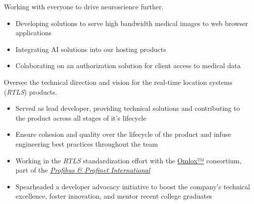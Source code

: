 \documentclass[10pt,a4paper,ragged2e,withhyper]{altacv}
\begin{document}
\begin{paracol}{2}


Working with everyone to drive neuroscience further.

\medskip

\begin{itemize}
  \item Developing solutions to serve high bandwidth medical images to web browser applications
  \item Integrating AI solutions into our hosting products
  \item Colaborating on an authorization solution for client access to medical data 
\end{itemize}


\divider

\medskip



Oversee the technical direction and vision for the real-time location systems (\textit{RTLS}) products.

\medskip

\begin{itemize}
  \item Served as lead developer, providing technical solutions and contributing to the product across all stages of it's lifecycle
  \item Ensure cohesion and quality over the lifecycle of the product and infuse engineering best practices throughout the team
  \item Working in the \textit{RTLS} standardization effort with the \href{https://omlox.com/}{Omlox™} consortium, part of the \href{https://www.profibus.com/technology/omlox}{\textit{Profibus \& Profinet International}}
  \item Spearheaded a developer advocacy initiative to boost the company's technical excellence, foster innovation, and mentor recent college graduates
\end{itemize}

\divider

\medskip



\end{paracol}
\end{document}
